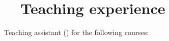 \documentclass[article, a4paper, 11pt, oneside]{memoir}
\newcommand{\myitem}[3]{\item[#1] #2 \par \small #3 \par\normalsize}
\begin{document}
    


\section[Teaching experience]{\faGraduationCap~~Teaching experience}

\newcommand{\course}{\emph}

Teaching assistant () for the following courses:


\end{document}
